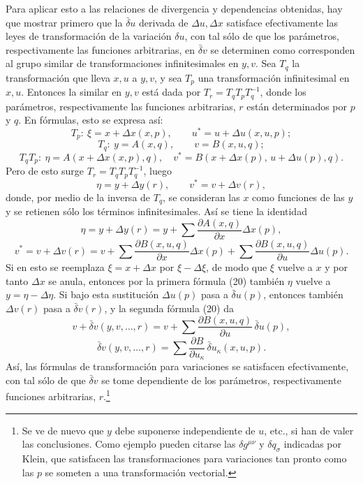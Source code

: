 \documentclass[11pt]{article}
\newcommand{\D}{\Delta}
\providecommand{\bd}{\bar{\delta}}
\providecommand{\p}{\partial}
\begin{document}
Para aplicar esto a las relaciones de divergencia y dependencias obtenidas, hay que mostrar primero que la \(\bd u\) derivada de \(\D u,\D x\) satisface efectivamente las leyes de transformación de la variación \(\delta u\), con tal sólo de que los parámetros, respectivamente las funciones arbitrarias, en \(\bd v\) se determinen como corresponden al grupo similar de transformaciones infinitesimales en \(y,v\). Sea \(T_q\) la transformación que lleva \(x,u\) a \(y,v\), y sea \(T_p\) una transformación infinitesimal en \(x,u\). Entonces la similar en \(y,v\) está dada por \(T_r=T_qT_pT_q^{-1}\), donde los parámetros, respectivamente las funciones arbitrarias, \(r\) están determinados por \(p\) y \(q\). En fórmulas, esto se expresa así:
\[
T_p:\ \xi=x+\D x(x,p),\qquad u^*=u+\D u(x,u,p);
\]
\[
T_q:\ y=A(x,q),\qquad v=B(x,u,q);
\]
\[
T_qT_p:\ \eta=A(x+\D x(x,p),q),\quad
v^*=B(x+\D x(p),\,u+\D u(p),q).
\]
Pero de esto surge \(T_r=T_qT_pT_q^{-1}\), luego
\[
\eta=y+\D y(r),\qquad v^*=v+\D v(r),
\]
donde, por medio de la inversa de \(T_q\), se consideran las \(x\) como funciones de las \(y\) y se retienen sólo los términos infinitesimales. Así se tiene la identidad
\begin{equation}
\eta=y+\D y(r)=y+\sum\frac{\p A(x,q)}{\p x}\D x(p),
\tag{20a}
\end{equation}
\begin{equation}
v^*=v+\D v(r)=v+\sum\frac{\p B(x,u,q)}{\p x}\D x(p)
+\sum\frac{\p B(x,u,q)}{\p u}\D u(p).
\tag{20b}
\end{equation}
Si en esto se reemplaza \(\xi=x+\D x\) por \(\xi-\D \xi\), de modo que \(\xi\) vuelve a \(x\) y por tanto \(\D x\) se anula, entonces por la primera fórmula (20) también \(\eta\) vuelve a \(y=\eta-\D\eta\). Si bajo esta sustitución \(\D u(p)\) pasa a \(\bd u(p)\), entonces también \(\D v(r)\) pasa a \(\bd v(r)\), y la segunda fórmula (20) da
\[
v+\bd v(y,v,\ldots,r)=v+\sum\frac{\p B(x,u,q)}{\p u}\,\bd u(p),
\]
\[
\bd v(y,v,\ldots,r)=\sum\frac{\p B}{\p u_\kappa}\,\bd u_\kappa(x,u,p).
\]
Así, las fórmulas de transformación para variaciones se satisfacen efectivamente, con tal sólo de que \(\bd v\) se tome dependiente de los parámetros, respectivamente funciones arbitrarias, \(r\).\footnote{Se ve de nuevo que \(y\) debe suponerse independiente de \(u\), etc., si han de valer las conclusiones. Como ejemplo pueden citarse las \(\delta g^{\mu\nu}\) y \(\delta q_\sigma\) indicadas por Klein, que satisfacen las transformaciones para variaciones tan pronto como las \(p\) se someten a una transformación vectorial.}
\end{document}
